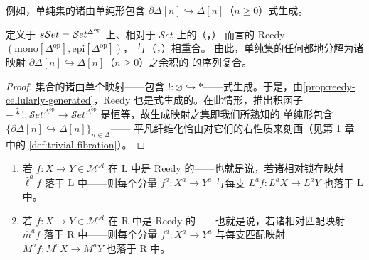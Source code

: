 例如，单纯集的诸\trMonomorphism{}由单纯形\trBoundary{}包含
$\partial\Delta[n]\hookrightarrow\Delta[n]$（$n\ge 0$）\trCell{}式生成。

\begin{lemma}\label{lem:mono-epi-reedy-sset}
定义于 $s\mathcal{S}et=\mathcal{S}et^{\Delta^{\mathrm{op}}}$ 上、相对于
$\mathcal{S}et$ 上的（\trMonomorphism，\trEpimorphism）
\trWeakFactorizationSystem{}而言的 Reedy \trWeakFactorizationSystem{}
$(\mathrm{mono}[\Delta^{\mathrm{op}}],\mathrm{epi}[\Delta^{\mathrm{op}}])$，
与（\trMonomorphism，\trTrivialFibration）\trWeakFactorizationSystem{}相重合。
由此，单纯集的任何\trMonomorphism{}都\trCanonical{}地分解为诸映射
$\partial\Delta[n]\hookrightarrow\Delta[n]$（$n\ge 0$）之余积的\trPushout{}%
的序列复合。
\end{lemma}

\begin{proof}
集合的诸\trMonomorphism{}由单个映射——包含 $!\colon\varnothing\hookrightarrow\ast$——\trCell{}式生成。于是，由\cref{prop:reedy-cellularly-generated}，Reedy
\trWeakFactorizationSystem{}也是\trCell{}式生成的。在此情形，推出积函子
$-\mathbin{\widehat{\ast}}!\colon\mathcal{S}et^{\Delta^{\mathrm{op}}}\to\mathcal{S}et^{\Delta^{\mathrm{op}}}$ 是恒等，故生成映射之集即我们所熟知的
单纯形\trBoundary{}包含 $\{\partial\Delta[n]\hookrightarrow\Delta[n]\}_{n\in\Delta}$——
平凡纤维化恰由对它们的右\trLifting{}性质来刻画（见第 1 章中的%
\cref{def:trivial-fibration}）。
\end{proof}

\begin{proposition}\label{prop:reedy-components}
\begin{enumerate}[label=(\roman*)]
\item 若 $f\colon X\to Y\in\mathcal{M}^{\mathcal{A}}$ 在 $\mathrm{L}$ 中是
  Reedy 的——也就是说，若诸相对锁存映射 $\widehat{\ell}^{a}f$ 落于
  $\mathrm{L}$ 中——则每个分量 $f^{a}\colon X^{a}\to Y^{a}$ 与每支\trLatchingMap
  $L^{a}f\colon L^{a}X\to L^{a}Y$ 也落于 $\mathrm{L}$ 中。
\item 若 $f\colon X\to Y\in\mathcal{M}^{\mathcal{A}}$ 在 $\mathrm{R}$ 中是
  Reedy 的——也就是说，若诸相对匹配映射 $\widehat{m}^{a}f$ 落于
  $\mathrm{R}$ 中——则每个分量 $f^{a}\colon X^{a}\to Y^{a}$ 与每支匹配映射
  $M^{a}f\colon M^{a}X\to M^{a}Y$ 也落于 $\mathrm{R}$ 中。
\end{enumerate}
\end{proposition}


